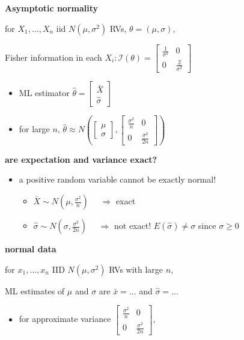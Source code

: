 \documentclass[10pt, landscape]{article}
\newcommand{\xbar}{\bar{x}}
\newcommand{\Xbar}{\bar{X}}
\newcommand{\seq}[2][n]{#2_1, \dots, #2_{#1}}
\begin{document}
\begin{multicols*}{4}
  \textbf{Asymptotic normality}

  for $\seq{X}$ iid $N(\mu, \sigma^2)$ RVs,  $\theta = (\mu, \sigma)$,

  Fisher information in each $X_i : \mathcal{I}(\theta) = 
  \begin{bmatrix}
    \frac{1}{\sigma^2} & 0 \\
    0 & \frac{2}{\sigma^2}
  \end{bmatrix}$

  \begin{itemize}
    \item ML estimator $\hat\theta = \begin{bmatrix} \Xbar \\ \hat\sigma \end{bmatrix}$
    \item for large $n$, $\hat\theta \approx N\left( 
        \begin{bmatrix} \mu \\ \sigma \end{bmatrix},
        \begin{bmatrix}
          \frac{\sigma^2}{n} & 0 \\
          0 & \frac{\sigma^2}{2n}
      \end{bmatrix} \right)$
  \end{itemize}

  \textbf{are expectation and variance exact?}

  \begin{itemize}
    \item a positive random variable cannot be exactly normal! 
      \begin{itemize}
        \item $\Xbar \sim N(\mu, \frac{\sigma^2}{n})$ $\quad \Rightarrow$ exact
        \item $\hat\sigma \sim N(\sigma, \frac{\sigma^2}{2n})$ $\quad \Rightarrow$ not exact! $E(\hat\sigma) \neq \sigma$ since $\sigma \geq 0$
      \end{itemize}
  \end{itemize}

  \textbf{normal data}

  for $\seq x$ IID $N(\mu, \sigma^2)$ RVs with large $n$,

  ML estimates of  $\mu$ and $\sigma$ are $\xbar = \dots$ and  $\hat\sigma = \dots$

  \begin{itemize}
    \item for approximate variance 
      $\begin{bmatrix}
        \frac{\sigma^2}{n} & 0 \\
        0 & \frac{\sigma^2}{2n}
      \end{bmatrix}$, 


\end{itemize}
\end{multicols*}
\end{document}
